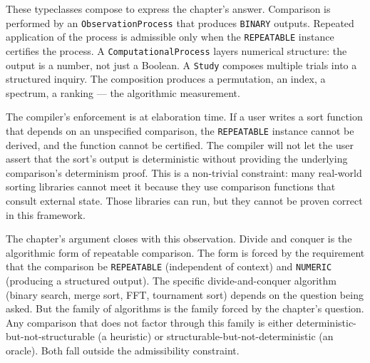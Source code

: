 These typeclasses compose to express the chapter's answer. Comparison is
performed by an \texttt{ObservationProcess} that produces \texttt{BINARY}
outputs. Repeated application of the process is admissible only when the
\texttt{REPEATABLE} instance certifies the process. A
\texttt{ComputationalProcess} layers numerical structure: the output is
a number, not just a Boolean. A \texttt{Study} composes multiple trials
into a structured inquiry. The composition produces a permutation, an
index, a spectrum, a ranking --- the algorithmic measurement.

The compiler's enforcement is at elaboration time. If a user writes a
sort function that depends on an unspecified comparison, the
\texttt{REPEATABLE} instance cannot be derived, and the function cannot
be certified. The compiler will not let the user assert that the sort's
output is deterministic without providing the underlying comparison's
determinism proof. This is a non-trivial constraint: many real-world
sorting libraries cannot meet it because they use comparison functions
that consult external state. Those libraries can run, but they cannot be
proven correct in this framework.

The chapter's argument closes with this observation. Divide and conquer
is the algorithmic form of repeatable comparison. The form is forced by
the requirement that the comparison be \texttt{REPEATABLE} (independent
of context) and \texttt{NUMERIC} (producing a structured output). The
specific divide-and-conquer algorithm (binary search, merge sort, FFT,
tournament sort) depends on the question being asked. But the family of
algorithms is the family forced by the chapter's question. Any
comparison that does not factor through this family is either
deterministic-but-not-structurable (a heuristic) or
structurable-but-not-deterministic (an oracle). Both fall outside the
admissibility constraint.

